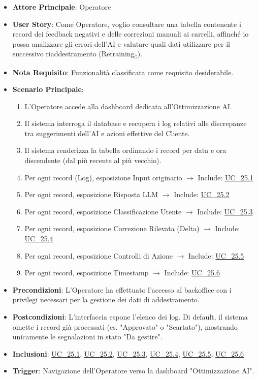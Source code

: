 \begin{itemize}
    \item \textbf{Attore Principale}: Operatore
    \item \textbf{User Story}: Come Operatore, voglio consultare una tabella contenente i record dei feedback negativi e delle correzioni manuali ai carrelli, affinché io possa analizzare gli errori dell'AI e valutare quali dati utilizzare per il successivo riaddestramento (Retraining\textsubscript{\textsc{g}}).
    \item \textbf{Nota Requisito}: Funzionalità classificata come requisito desiderabile.
    \item \textbf{Scenario Principale}: 
    \begin{enumerate}
        \item L'Operatore accede alla dashboard dedicata all'Ottimizzazione AI.
        \item Il sistema interroga il database e recupera i log relativi alle discrepanze tra suggerimenti dell'AI e azioni effettive del Cliente.
        \item Il sistema renderizza la tabella ordinando i record per data e ora discendente (dal più recente al più vecchio).
        \item Per ogni record (Log), esposizione Input originario $\rightarrow$ Include: \hyperref[uc_25.1]{UC\_25.1}
        \item Per ogni record, esposizione Risposta LLM $\rightarrow$ Include: \hyperref[uc_25.2]{UC\_25.2}
        \item Per ogni record, esposizione Classificazione Utente $\rightarrow$ Include: \hyperref[uc_25.3]{UC\_25.3}
        \item Per ogni record, esposizione Correzione Rilevata (Delta) $\rightarrow$ Include: \hyperref[uc_25.4]{UC\_25.4}
        \item Per ogni record, esposizione Controlli di Azione $\rightarrow$ Include: \hyperref[uc_25.5]{UC\_25.5}
        \item Per ogni record, esposizione Timestamp $\rightarrow$ Include: \hyperref[uc_25.6]{UC\_25.6}
    \end{enumerate}
    \item \textbf{Precondizioni}: L'Operatore ha effettuato l'accesso al backoffice con i privilegi necessari per la gestione dei dati di addestramento.
    \item \textbf{Postcondizioni}: L'interfaccia espone l'elenco dei log. Di default, il sistema omette i record già processati (es. "Approvato" o "Scartato"), mostrando unicamente le segnalazioni in stato "Da gestire".
    \item \textbf{Inclusioni}: \hyperref[uc_25.1]{UC\_25.1}, \hyperref[uc_25.2]{UC\_25.2}, \hyperref[uc_25.3]{UC\_25.3}, \hyperref[uc_25.4]{UC\_25.4}, \hyperref[uc_25.5]{UC\_25.5}, \hyperref[uc_25.6]{UC\_25.6}
    \item \textbf{Trigger}: Navigazione dell'Operatore verso la dashboard "Ottimizzazione AI".
\end{itemize}

